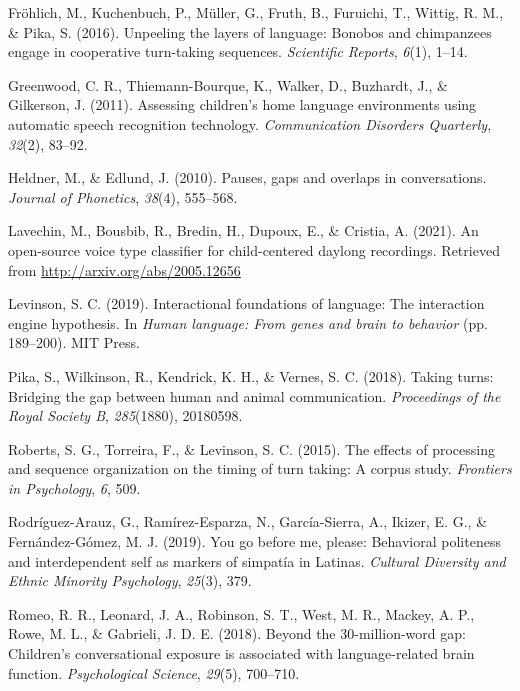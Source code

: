\documentclass[10pt, letterpaper]{article}
\begin{document}
\leavevmode\hypertarget{ref-frohlich2016unpeeling}{}%
Fröhlich, M., Kuchenbuch, P., Müller, G., Fruth, B., Furuichi, T.,
Wittig, R. M., \& Pika, S. (2016). Unpeeling the layers of language:
Bonobos and chimpanzees engage in cooperative turn-taking sequences.
\emph{Scientific Reports}, \emph{6}(1), 1--14.

\leavevmode\hypertarget{ref-LENA}{}%
Greenwood, C. R., Thiemann-Bourque, K., Walker, D., Buzhardt, J., \&
Gilkerson, J. (2011). Assessing children's home language environments
using automatic speech recognition technology. \emph{Communication
Disorders Quarterly}, \emph{32}(2), 83--92.

\leavevmode\hypertarget{ref-heldner2010pauses}{}%
Heldner, M., \& Edlund, J. (2010). Pauses, gaps and overlaps in
conversations. \emph{Journal of Phonetics}, \emph{38}(4), 555--568.

\leavevmode\hypertarget{ref-lavechin2021vtc}{}%
Lavechin, M., Bousbib, R., Bredin, H., Dupoux, E., \& Cristia, A.
(2021). An open-source voice type classifier for child-centered daylong
recordings. Retrieved from \url{http://arxiv.org/abs/2005.12656}

\leavevmode\hypertarget{ref-levinson2019interactional}{}%
Levinson, S. C. (2019). Interactional foundations of language: The
interaction engine hypothesis. In \emph{Human language: From genes and
brain to behavior} (pp. 189--200). MIT Press.

\leavevmode\hypertarget{ref-pika2018taking}{}%
Pika, S., Wilkinson, R., Kendrick, K. H., \& Vernes, S. C. (2018).
Taking turns: Bridging the gap between human and animal communication.
\emph{Proceedings of the Royal Society B}, \emph{285}(1880), 20180598.

\leavevmode\hypertarget{ref-roberts2015effects}{}%
Roberts, S. G., Torreira, F., \& Levinson, S. C. (2015). The effects of
processing and sequence organization on the timing of turn taking: A
corpus study. \emph{Frontiers in Psychology}, \emph{6}, 509.

\leavevmode\hypertarget{ref-rodriguez2019you}{}%
Rodríguez-Arauz, G., Ramírez-Esparza, N., García-Sierra, A., Ikizer, E.
G., \& Fernández-Gómez, M. J. (2019). You go before me, please:
Behavioral politeness and interdependent self as markers of simpatía in
Latinas. \emph{Cultural Diversity and Ethnic Minority Psychology},
\emph{25}(3), 379.

\leavevmode\hypertarget{ref-romeo2018beyond}{}%
Romeo, R. R., Leonard, J. A., Robinson, S. T., West, M. R., Mackey, A.
P., Rowe, M. L., \& Gabrieli, J. D. E. (2018). Beyond the
30-million-word gap: Children's conversational exposure is associated
with language-related brain function. \emph{Psychological Science},
\emph{29}(5), 700--710.
\end{document}
